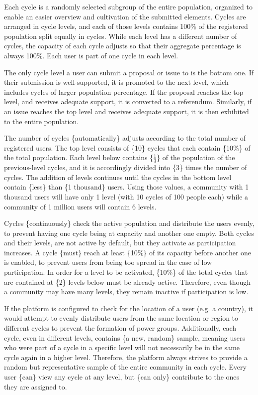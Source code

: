 \documentclass[a4paper,11pt]{article}
\begin{document}
\begin{multicols}{2}
Each cycle is a randomly selected subgroup of the entire population, organized to enable an easier overview and cultivation of the submitted elements. Cycles are arranged in cycle levels, and each of those levels contains 100\% of the registered population split equally in cycles. While each level has a different number of cycles, the capacity of each cycle adjusts so that their aggregate percentage is always 100\%. Each user is part of one cycle in each level.

The only cycle level a user can submit a proposal or issue to is the bottom one. If their submission is well-supported, it is promoted to the next level, which includes cycles of larger population percentage. If the proposal reaches the top level, and receives adequate support, it is converted to a referendum. Similarly, if an issue reaches the top level and receives adequate support, it is then exhibited to the entire population.

The number of cycles \{automatically\} adjusts according to the total number of registered users. The top level consists of \{10\} cycles that each contain \{10\%\} of the total population. Each level below contains \{$\frac{1}{3}$\} of the population of the previous-level cycles, and it is accordingly divided into \{3\} times the number of cycles. The addition of levels continues until the cycles in the bottom level contain \{less\} than \{1 thousand\} users. Using those values, a community with 1 thousand users will have only 1 level (with 10 cycles of 100 people each) while a community of 1 million users will contain 6 levels.

Cycles \{continuously\} check the active population and distribute the users evenly, to prevent having one cycle being at capacity and another one empty. Both cycles and their levels, are not active by default, but they activate as participation increases. A cycle \{must\} reach at least \{10\%\} of its capacity before another one is enabled, to prevent users from being too spread in the case of low participation. In order for a level to be activated, \{10\%\} of the total cycles that are contained at \{2\} levels below must be already active. Therefore, even though a community may have many levels, they remain inactive if participation is low.

If the platform is configured to check for the location of a user (e.g. a country), it would attempt to evenly distribute users from the same location or region to different cycles to prevent the formation of power groups. Additionally, each cycle, even in different levels, contains \{a new, random\} sample, meaning users who were part of a cycle in a specific level will not necessarily be in the same cycle again in a higher level. Therefore, the platform always strives to provide a random but representative sample of the entire community in each cycle. Every user \{can\} view any cycle at any level, but \{can only\} contribute to the ones they are assigned to.


\end{multicols}
\end{document}
